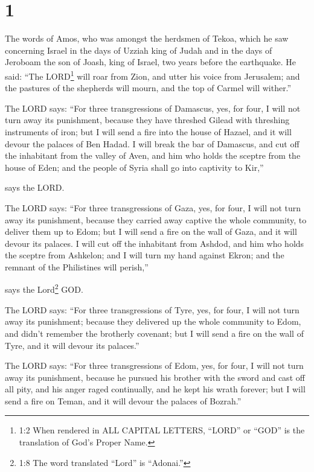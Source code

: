 \hypertarget{section}{%
\section{1}\label{section}}

 The words of Amos, who was amongst the herdsmen of Tekoa,
which he saw concerning Israel in the days of Uzziah king of Judah and
in the days of Jeroboam the son of Joash, king of Israel, two years
before the earthquake.  He said: ``The LORD\footnote{1:2
  When rendered in ALL CAPITAL LETTERS, ``LORD'' or ``GOD'' is the
  translation of God's Proper Name.} will roar from Zion, and utter his
voice from Jerusalem; and the pastures of the shepherds will mourn, and
the top of Carmel will wither.''

 The LORD says: ``For three transgressions of Damascus, yes,
for four, I will not turn away its punishment, because they have
threshed Gilead with threshing instruments of iron;  but I
will send a fire into the house of Hazael, and it will devour the
palaces of Ben Hadad.  I will break the bar of Damascus, and
cut off the inhabitant from the valley of Aven, and him who holds the
sceptre from the house of Eden; and the people of Syria shall go into
captivity to Kir,''

says the LORD.

 The LORD says: ``For three transgressions of Gaza, yes, for
four, I will not turn away its punishment, because they carried away
captive the whole community, to deliver them up to Edom; 
but I will send a fire on the wall of Gaza, and it will devour its
palaces.  I will cut off the inhabitant from Ashdod, and him
who holds the sceptre from Ashkelon; and I will turn my hand against
Ekron; and the remnant of the Philistines will perish,''

says the Lord\footnote{1:8 The word translated ``Lord'' is ``Adonai.''}
GOD.

 The LORD says: ``For three transgressions of Tyre, yes, for
four, I will not turn away its punishment; because they delivered up the
whole community to Edom, and didn't remember the brotherly covenant;
 but I will send a fire on the wall of Tyre, and it will
devour its palaces.''

 The LORD says: ``For three transgressions of Edom, yes,
for four, I will not turn away its punishment, because he pursued his
brother with the sword and cast off all pity, and his anger raged
continually, and he kept his wrath forever;  but I will
send a fire on Teman, and it will devour the palaces of Bozrah.''

